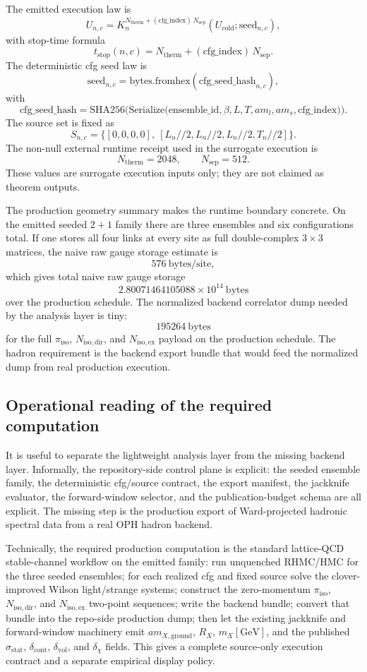 \documentclass[11pt]{article}
\begin{document}
The emitted execution law is
\[
U_{n,c}
=
K_n^{N_{\mathrm{therm}} + (\mathrm{cfg\_index})\,N_{\mathrm{sep}}}(U_{\mathrm{cold}}; \mathrm{seed}_{n,c}),
\]
with stop-time formula
\[
t_{\mathrm{stop}}(n,c)
=
N_{\mathrm{therm}} + (\mathrm{cfg\_index})\,N_{\mathrm{sep}}.
\]
The deterministic cfg seed law is
\[
\mathrm{seed}_{n,c}
=
\mathrm{bytes.fromhex}(\mathrm{cfg\_seed\_hash}_{n,c}),
\]
with
\[
\mathrm{cfg\_seed\_hash}
=
\mathrm{SHA256}\!\Big(
\mathrm{Serialize}\!\big(
\mathrm{ensemble\_id},\beta,L,T,a m_l,a m_s,\mathrm{cfg\_index}
\big)
\Big).
\]
The source set is fixed as
\[
S_{n,c} = \{ [0,0,0,0],\ [L_n//2, L_n//2, L_n//2, T_n//2] \}.
\]
The non-null external runtime receipt used in the surrogate execution is
\[
N_{\mathrm{therm}} = 2048,
\qquad
N_{\mathrm{sep}} = 512.
\]
These values are surrogate execution inputs only; they are not claimed as theorem outputs.

The production geometry summary makes the runtime boundary concrete. On the emitted
seeded \(2+1\) family there are three ensembles and six configurations total. If one stores all
four links at every site as full double-complex \(3\times 3\) matrices, the naive raw gauge
storage estimate is
\[
576\ \mathrm{bytes/site},
\]
which gives total naive raw gauge storage
\[
2.80071464105088\times 10^{14}\ \mathrm{bytes}
\]
over the production schedule. The normalized backend correlator dump needed by the
analysis layer is tiny:
\[
195264\ \mathrm{bytes}
\]
for the full \(\pi_{\mathrm{iso}}\), \(N_{\mathrm{iso,dir}}\), and \(N_{\mathrm{iso,ex}}\)
payload on the production schedule. The hadron requirement is the backend export bundle
that would feed the normalized dump from real production execution.

\subsection{Operational reading of the required computation}

It is useful to separate the lightweight analysis layer from the missing backend layer.
Informally, the repository-side control plane is explicit: the seeded ensemble family, the
deterministic cfg/source contract, the export manifest, the jackknife evaluator, the forward-window
selector, and the publication-budget schema are all explicit. The missing step is the production
export of Ward-projected hadronic spectral data from a real OPH hadron backend.

Technically, the required production computation is the standard lattice-QCD stable-channel
workflow on the emitted family: run unquenched RHMC/HMC for the three seeded ensembles; for each
realized cfg and fixed source solve the clover-improved Wilson light/strange systems; construct the
zero-momentum \(\pi_{\mathrm{iso}}\), \(N_{\mathrm{iso,dir}}\), and \(N_{\mathrm{iso,ex}}\)
two-point sequences; write the backend bundle; convert that bundle into the repo-side production
dump; then let the existing jackknife and forward-window machinery emit
\(a m_{X,\mathrm{ground}}\), \(R_X\), \(m_X[\mathrm{GeV}]\), and the published
\(\sigma_{\mathrm{stat}}\), \(\delta_{\mathrm{cont}}\), \(\delta_{\mathrm{vol}}\), and
\(\delta_{\chi}\) fields. This gives a complete source-only execution contract and a separate
empirical display policy.
\end{document}
